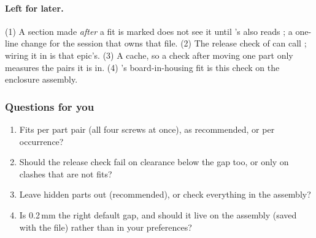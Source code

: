 \paragraph{Left for later.} (1) A section made \emph{after} a fit is marked does not see it until
's  also reads ; a one-line
change for the session that owns that file. (2) The release check of  can call ;
wiring it in is that epic's. (3) A cache, so a check after moving one part only measures the pairs it is in. (4)
's board-in-housing fit is this check on the enclosure assembly.

\subsubsection*{Questions for you}

\begin{enumerate}[nosep]
  \item Fits per part pair (all four screws at once), as recommended, or per occurrence?
  \item Should the release check fail on clearance below the gap too, or only on clashes that are not fits?
  \item Leave hidden parts out (recommended), or check everything in the assembly?
  \item Is 0.2\,mm the right default gap, and should it live on the assembly (saved with the file) rather than in
    your preferences?
\end{enumerate}
